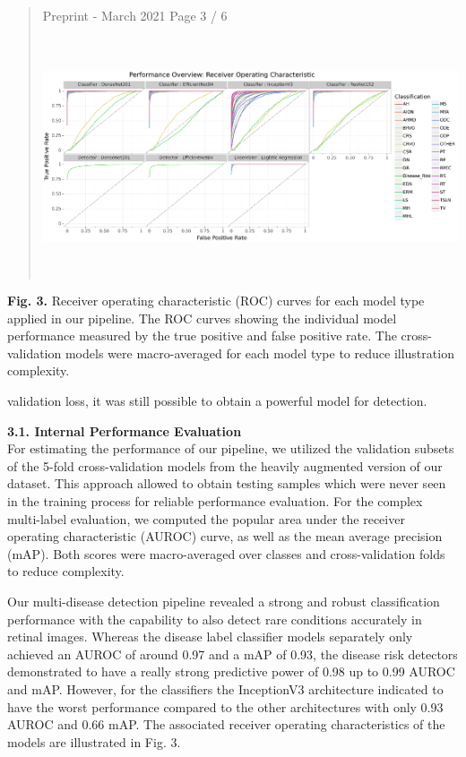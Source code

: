 \documentclass[
]{article}
\begin{document}
\begin{quote}
Preprint - March 2021 Page 3 / 6

\includegraphics[width=6.70417in,height=2.76944in]{vertopal_2f1cfafaf78f44c9b64931ec8d4445e5/media/image3.png}
\end{quote}

\textbf{Fig. 3.} Receiver operating characteristic (ROC) curves for each
model type applied in our pipeline. The ROC curves showing the
individual model performance measured by the true positive and false
positive rate. The cross-validation models were macro-averaged for each
model type to reduce illustration complexity.

validation loss, it was still possible to obtain a powerful model for
detection.

\textbf{3.1. Internal Performance Evaluation}\\
For estimating the performance of our pipeline, we utilized the
validation subsets of the 5-fold cross-validation models from the
heavily augmented version of our dataset. This approach allowed to
obtain testing samples which were never seen in the training process for
reliable performance evaluation. For the complex multi-label evaluation,
we computed the popular area under the receiver operating characteristic
(AUROC) curve, as well as the mean average precision (mAP). Both scores
were macro-averaged over classes and cross-validation folds to reduce
complexity.

Our multi-disease detection pipeline revealed a strong and robust
classification performance with the capability to also detect rare
conditions accurately in retinal images. Whereas the disease label
classifier models separately only achieved an AUROC of around 0.97 and a
mAP of 0.93, the disease risk detectors demonstrated to have a really
strong predictive power of 0.98 up to 0.99 AUROC and mAP. However, for
the classifiers the InceptionV3 architecture indicated to have the worst
performance compared to the other architectures with only 0.93 AUROC and
0.66 mAP. The associated receiver operating characteristics of the
models are illustrated in Fig. 3.
\end{document}
